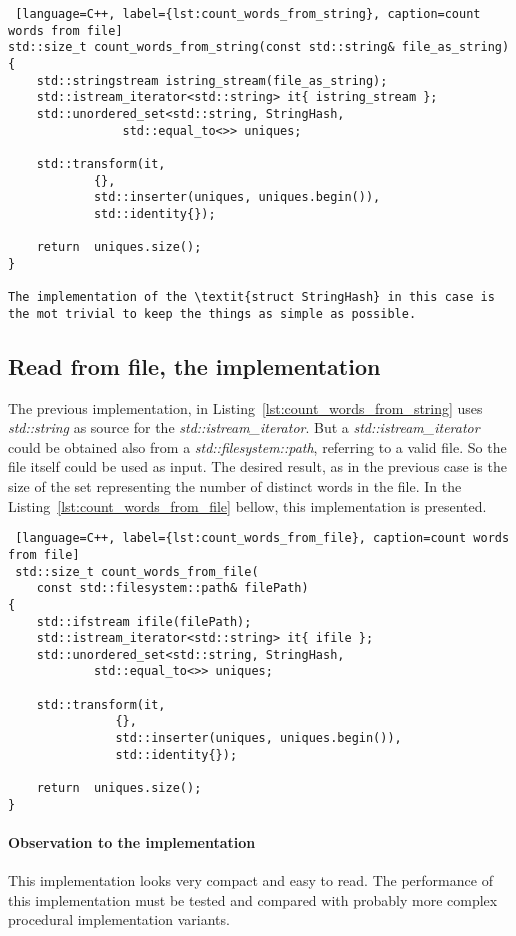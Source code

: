 \documentclass{article}
\begin{document}
\begin{lstlisting} [language=C++, label={lst:count_words_from_string}, caption=count words from file]
std::size_t count_words_from_string(const std::string& file_as_string)
{
    std::stringstream istring_stream(file_as_string);
    std::istream_iterator<std::string> it{ istring_stream };
    std::unordered_set<std::string, StringHash, 
    			std::equal_to<>> uniques;

    std::transform(it, 
    		{}, 
    		std::inserter(uniques, uniques.begin()), 
    		std::identity{});

    return  uniques.size();
}

The implementation of the \textit{struct StringHash} in this case is the mot trivial to keep the things as simple as possible.

\end{lstlisting}


\subsection{Read from file, the implementation}

The previous implementation, in Listing~\ref{lst:count_words_from_string} uses \textit{std::string} as source for the \textit{std::istream\_iterator}. But a \textit{std::istream\_iterator} could be obtained also from a \textit{std::filesystem::path}, referring to a valid file. So the file itself could be used as input. The desired result, as in the previous case is the size of the set representing the  number of distinct words in the file. In the Listing~\ref{lst:count_words_from_file} bellow, this implementation is presented.

\begin{lstlisting} [language=C++, label={lst:count_words_from_file}, caption=count words from file]
 std::size_t count_words_from_file(
 	const std::filesystem::path& filePath)
{
    std::ifstream ifile(filePath);
    std::istream_iterator<std::string> it{ ifile };
    std::unordered_set<std::string, StringHash, 
    		std::equal_to<>> uniques;

    std::transform(it, 
    		   {},
    		   std::inserter(uniques, uniques.begin()), 
    		   std::identity{});

    return  uniques.size();
}
\end{lstlisting}

\paragraph{Observation to the implementation}
This implementation looks very compact and easy to read. The performance of this implementation must be tested and compared with probably more complex procedural implementation variants. 
\end{document}
